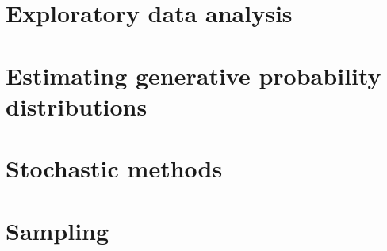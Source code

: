 \documentclass[oneside]{book}
\begin{document}
\part{Exploratory data analysis}







\part{Estimating generative probability distributions}













\part{Stochastic methods}







\part{Sampling}

\end{document}
